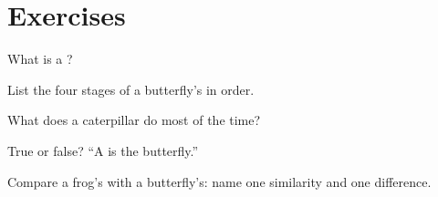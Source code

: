 \section{Exercises}

\begin{exercise}[$\star$]\label{exo:g3:life-cycles:1}
What is a ?
\end{exercise}

\begin{exercise}[$\star$]\label{exo:g3:life-cycles:2}
List the four stages of a butterfly's  in order.
\end{exercise}

\begin{exercise}[$\star$]\label{exo:g3:life-cycles:3}
What does a caterpillar do most of the time?
\end{exercise}

\begin{exercise}[$\star$]\label{exo:g3:life-cycles:4}
True or false? ``A  is the  butterfly.''
\end{exercise}

\begin{exercise}[$\star\star$]\label{exo:g3:life-cycles:5}
Compare a frog's  with a butterfly's: name one similarity
and one difference.
\end{exercise}

